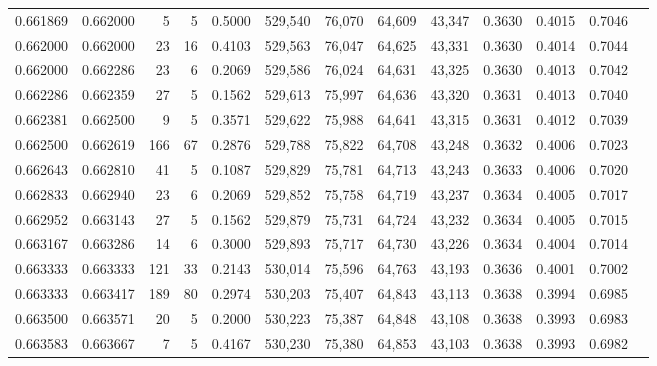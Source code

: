 \begin{tabular}{rrrrrrrrrrrrr}
0.661869 & 0.662000 &     5 &   5 &                                     0.5000 & 529,540 &  76,070 &  64,609 &  43,347 & 0.3630 & 0.4015 & 0.7046 \\
0.662000 & 0.662000 &    23 &  16 &                                     0.4103 & 529,563 &  76,047 &  64,625 &  43,331 & 0.3630 & 0.4014 & 0.7044 \\
0.662000 & 0.662286 &    23 &   6 &                                     0.2069 & 529,586 &  76,024 &  64,631 &  43,325 & 0.3630 & 0.4013 & 0.7042 \\
0.662286 & 0.662359 &    27 &   5 &                                     0.1562 & 529,613 &  75,997 &  64,636 &  43,320 & 0.3631 & 0.4013 & 0.7040 \\
0.662381 & 0.662500 &     9 &   5 &                                     0.3571 & 529,622 &  75,988 &  64,641 &  43,315 & 0.3631 & 0.4012 & 0.7039 \\
0.662500 & 0.662619 &   166 &  67 &                                     0.2876 & 529,788 &  75,822 &  64,708 &  43,248 & 0.3632 & 0.4006 & 0.7023 \\
0.662643 & 0.662810 &    41 &   5 &                                     0.1087 & 529,829 &  75,781 &  64,713 &  43,243 & 0.3633 & 0.4006 & 0.7020 \\
0.662833 & 0.662940 &    23 &   6 &                                     0.2069 & 529,852 &  75,758 &  64,719 &  43,237 & 0.3634 & 0.4005 & 0.7017 \\
0.662952 & 0.663143 &    27 &   5 &                                     0.1562 & 529,879 &  75,731 &  64,724 &  43,232 & 0.3634 & 0.4005 & 0.7015 \\
0.663167 & 0.663286 &    14 &   6 &                                     0.3000 & 529,893 &  75,717 &  64,730 &  43,226 & 0.3634 & 0.4004 & 0.7014 \\
0.663333 & 0.663333 &   121 &  33 &                                     0.2143 & 530,014 &  75,596 &  64,763 &  43,193 & 0.3636 & 0.4001 & 0.7002 \\
0.663333 & 0.663417 &   189 &  80 &                                     0.2974 & 530,203 &  75,407 &  64,843 &  43,113 & 0.3638 & 0.3994 & 0.6985 \\
0.663500 & 0.663571 &    20 &   5 &                                     0.2000 & 530,223 &  75,387 &  64,848 &  43,108 & 0.3638 & 0.3993 & 0.6983 \\
0.663583 & 0.663667 &     7 &   5 &                                     0.4167 & 530,230 &  75,380 &  64,853 &  43,103 & 0.3638 & 0.3993 & 0.6982 \\

\end{tabular}
